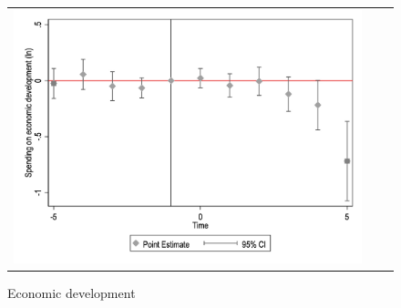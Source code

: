 \begin{figure}[ht]
\begin{tabular}{@{}ccc@{}}
\begin{minipage}[t]{0.32\textwidth}
            \caption{Economic development}
            \includegraphics[width=\linewidth]{images/pop_10000/caseventdd_ln_q4_11_step1.jpg}
            \label{fig:casecodev}
        \end{minipage} \\[10pt]


\end{tabular}
\end{figure}
